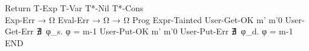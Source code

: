{{               { 
               }
    }
    {Return}{ 
              { }
              {  }
    }
    {T-Exp}{ 
                {}
                {}
            }
    {T-Var}{ 
                {}
                {}
    }
    {T*-Nil}{ 
                 { }
                 {}
    }
    {T*-Cons}{ 
                  { \\
                   }
                  {}
    }
    {Exp-Err}{ 
                 { }
                 {  → Ω }
    }
    {Eval-Err}{ 
                  {  → Ω }
                  {  → Ω }
    }
    {Prog}{ 
              {}
              {}
    }
    {Expr-Tainted}{ 
                      { }
                      {  }
    }
    {User-Get-OK}{ 
                     { 
                         {m'}{\iPass}
                     }
                     { 
                       {m'}{0} %
                     }
    }
    {User-Get-Err}{ 
                      {
                        ∄~φ_s. φ = 
                      }
                      { 
                           {m}{-1}
                      }
    }
    {User-Put-OK}{ 
                     { 
                         {m'}{\iPass}
                     }
                     { 
                         {m'}{0}
                     }
    }
    {User-Put-Err}{ 
                      {
                        ∄~φ_d. φ = 
                      }
                      { 
                           {m}{-1}
                      }
    }
    {END}
}

\def\figctx{
  \begin{align*}
  \gramdef{Contextes}{C}
    { \ctxEmpty }{}
    { \ctxOp{C}{e} }{}
    { \ctxOp{v}{C} }{}
    { \ctxUnOp{C} }{}
    { \ctxSet{C}{e} }{}
    { \ctxSet{φ}{C} }{}
    { \eStruct{ l_1:v_1 ; … ; l_i:C ; … ; l_n:e_n } }{}
    { \eArray{ v_1 ; … ; C ; … ; e_n } }{}
    { C (e_1, …, e_n) }{}
    { f (v_1, …, C, …, e_n) }{}
    { \ctxLvField{C}{l_S} }{}
    { \ctxLvIndex{C}{e} }{}
    { \ctxLvIndex{φ}{C} }{}
    { C;i }{}
    { \iIf{C}{i_1}{i_2} }{}
    { \iReturn{C} }{}
    { \iDecl{x}{C}{i} }{}
    {END}
  \end{align*}
}
